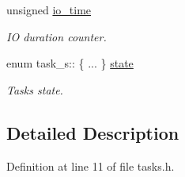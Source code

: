 \begin{DoxyCompactItemize}
unsigned \hyperlink{structtask__s_a35bfd62bed257847312e3da43efd6d9c}{io\-\_\-time}
\begin{DoxyCompactList}\small\item\em I\-O duration counter. \end{DoxyCompactList}\item 
enum task\-\_\-s\-:: \{ ... \}  \hyperlink{structtask__s_ae7a9cf3d567939ba2c9866cdfba022d8}{state}
\begin{DoxyCompactList}\small\item\em Tasks state. \end{DoxyCompactList}\end{DoxyCompactItemize}


\subsection{Detailed Description}


Definition at line 11 of file tasks.\-h.



